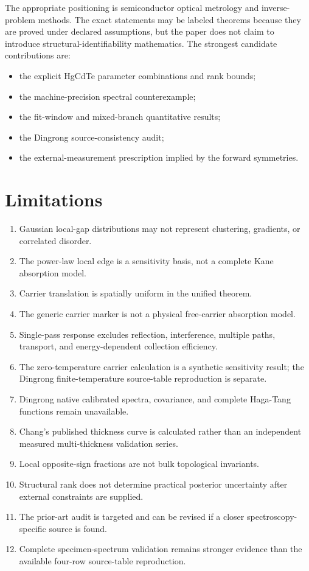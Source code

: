 \documentclass[12pt]{article}
\begin{document}
The appropriate positioning is semiconductor optical metrology and inverse-problem methods. The exact statements may be labeled theorems because they are proved under declared assumptions, but the paper does not claim to introduce structural-identifiability mathematics. The strongest candidate contributions are:

\begin{itemize}
\item the explicit HgCdTe parameter combinations and rank bounds;
\item the machine-precision spectral counterexample;
\item the fit-window and mixed-branch quantitative results;
\item the Dingrong source-consistency audit;
\item the external-measurement prescription implied by the forward symmetries.
\end{itemize}

\section{Limitations}

\begin{enumerate}
\item Gaussian local-gap distributions may not represent clustering, gradients, or correlated disorder.
\item The power-law local edge is a sensitivity basis, not a complete Kane absorption model.
\item Carrier translation is spatially uniform in the unified theorem.
\item The generic carrier marker is not a physical free-carrier absorption model.
\item Single-pass response excludes reflection, interference, multiple paths, transport, and energy-dependent collection efficiency.
\item The zero-temperature carrier calculation is a synthetic sensitivity result; the Dingrong finite-temperature source-table reproduction is separate.
\item Dingrong native calibrated spectra, covariance, and complete Haga-Tang functions remain unavailable.
\item Chang's published thickness curve is calculated rather than an independent measured multi-thickness validation series.
\item Local opposite-sign fractions are not bulk topological invariants.
\item Structural rank does not determine practical posterior uncertainty after external constraints are supplied.
\item The prior-art audit is targeted and can be revised if a closer spectroscopy-specific source is found.
\item Complete specimen-spectrum validation remains stronger evidence than the available four-row source-table reproduction.
\end{enumerate}
\end{document}
